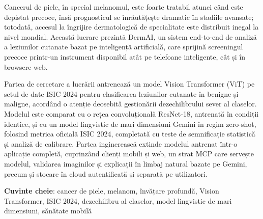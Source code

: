 Cancerul de piele, în special melanomul, este foarte tratabil atunci când este
depistat precoce, însă prognosticul se înrăutățește dramatic în stadiile
avansate; totodată, accesul la îngrijire dermatologică de specialitate este
distribuit inegal la nivel mondial. Această lucrare prezintă DermAI, un sistem
end-to-end de analiză a leziunilor cutanate bazat pe inteligență artificială,
care sprijină screeningul precoce printr-un instrument disponibil atât pe
telefoane inteligente, cât și în browsere web.

Partea de cercetare a lucrării antrenează un model Vision Transformer (ViT) pe
setul de date ISIC 2024 pentru clasificarea leziunilor cutanate în benigne și
maligne, acordând o atenție deosebită gestionării dezechilibrului sever al
claselor. Modelul este comparat cu o rețea convoluțională ResNet-18, antrenată în
condiții identice, și cu un model lingvistic de mari dimensiuni Gemini în regim
zero-shot, folosind metrica oficială ISIC 2024, completată cu teste de
semnificație statistică și analiză de calibrare. Partea inginerească extinde
modelul antrenat într-o aplicație completă, cuprinzând clienți mobili și web, un
strat MCP care servește modelul, validarea imaginilor și explicații în limbaj
natural bazate pe Gemini, precum și stocare în cloud autentificată și separată pe
utilizatori.

\textbf{Cuvinte cheie}: cancer de piele, melanom, învățare profundă, Vision
Transformer, ISIC 2024, dezechilibru al claselor, model lingvistic de mari
dimensiuni, sănătate mobilă
